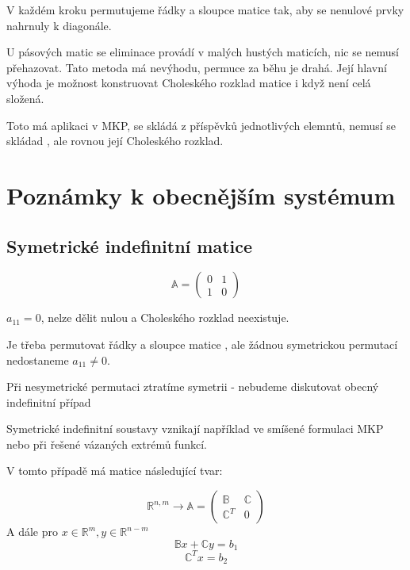\documentclass[../main.tex]{subfiles}
\begin{document}
V každém kroku permutujeme řádky a sloupce matice \matA tak, aby se nenulové prvky nahrnuly k diagonále.

U pásových matic se eliminace provádí v malých hustých maticích, nic se nemusí přehazovat.
Tato metoda má nevýhodu, permuce za běhu je drahá. 
Její hlavní výhoda je možnost konstruovat Choleského rozklad matice \matA i když \matA není celá složená.

Toto má aplikaci v MKP, \matA se skládá z příspěvků jednotlivých elemntů, nemusí se skládad \matA , ale rovnou její Choleského rozklad.



\section{Poznámky k obecnějším systémum}

\subsection{Symetrické indefinitní matice}

\begin{example}
    \begin{equation*}        
        \mathbb{A} = \begin{pmatrix}
            0 & 1 \\
            1 & 0
        \end{pmatrix}
    \end{equation*}

    $a_{11}=0$, nelze dělit nulou a Choleského rozklad neexistuje.

    Je třeba permutovat řádky a sloupce matice \matA, ale žádnou symetrickou permutací nedostaneme $a_{11}\neq 0$.

    Při nesymetrické permutaci ztratíme symetrii - nebudeme diskutovat obecný indefinitní případ
\end{example}

Symetrické indefinitní soustavy vznikají například ve smíšené formulaci MKP nebo při řešené vázaných extrémů funkcí.

V tomto případě má matice \matA následující tvar:

\begin{equation*}
    \mathbb{R}^{n,m} \rightarrow \mathbb{A} = \begin{pmatrix}
        \mathbb{B} & \mathbb{C}\\
        \mathbb{C}^T & 0
    \end{pmatrix}
\end{equation*}
A dále pro $x\in \mathbb{R}^m, y \in \mathbb{R}^{n-m}$
\begin{equation}\label{eq:2-11:prvni}
    \mathbb{B} x + \mathbb{C} y = b_1
\end{equation}
\begin{equation}\label{eq:2-11:druha}
    \mathbb{C}^T x = b_2
\end{equation}
\end{document}
